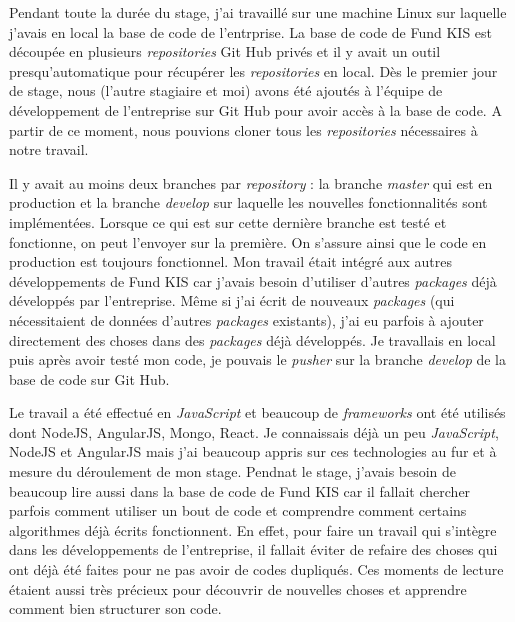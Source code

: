 Pendant toute la durée du stage, j'ai travaillé sur une machine Linux sur laquelle j'avais en local la base de code de l'entrprise. La base de code de Fund KIS est découpée en plusieurs \textit{repositories} Git Hub privés et il y avait un outil presqu'automatique pour récupérer les \textit{repositories} en local. Dès le premier jour de stage, nous (l'autre stagiaire et moi) avons été ajoutés à l'équipe de développement de l'entreprise sur Git Hub pour avoir accès à la base de code. A partir de ce moment, nous pouvions cloner tous les \textit{repositories} nécessaires à notre travail.


\vspace{3mm}
Il y avait au moins deux branches par \textit{repository} : la branche \textit{master} qui est en production et la branche \textit{develop} sur laquelle les nouvelles fonctionnalités sont implémentées. Lorsque ce qui est sur cette dernière branche est testé et fonctionne, on peut l'envoyer sur la première. On s'assure ainsi que le code en production est toujours fonctionnel. Mon travail était intégré aux autres développements de Fund KIS car j'avais besoin d'utiliser d'autres \textit{packages} déjà développés par l'entreprise. Même si j'ai écrit de nouveaux \textit{packages} (qui nécessitaient de données d'autres \textit{packages} existants), j'ai eu parfois à ajouter directement des choses dans des \textit{packages} déjà développés. Je travallais en local puis après avoir testé mon code, je pouvais le \textit{pusher} sur la branche \textit{develop} de la base de code sur Git Hub.

\vspace{3mm}

Le travail a été effectué en \textit{JavaScript} et beaucoup de \textit{frameworks} ont été utilisés dont NodeJS, AngularJS, Mongo, React. Je connaissais déjà un peu \textit{JavaScript}, NodeJS et AngularJS mais j'ai beaucoup appris sur ces technologies au fur et à mesure du déroulement de mon stage. Pendnat le stage, j'avais besoin de beaucoup lire aussi dans la base de code de Fund KIS car il fallait chercher parfois comment utiliser un bout de code et comprendre comment certains algorithmes déjà écrits fonctionnent. En effet, pour faire un travail qui s'intègre dans les développements de l'entreprise, il fallait éviter de refaire des choses qui ont déjà été faites pour ne pas avoir de codes dupliqués. Ces moments de lecture étaient aussi très précieux pour découvrir de nouvelles choses et apprendre comment bien structurer son code.
